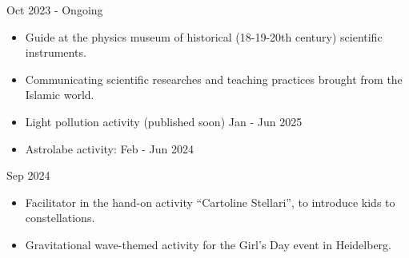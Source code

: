 %
%
%


\begin{experiences}
     {Oct 2023 - Ongoing}%
    {
     \begin{itemize}
         \item Guide at the physics museum of historical (18-19-20th century) scientific instruments.
     \end{itemize}}
     \smallskip
    {
     \begin{itemize}
         \item Communicating scientific researches and teaching practices brought from the Islamic world.
     \end{itemize}}

    \emptySeparator
    {
     \begin{itemize}
         \item Light pollution activity (published soon) \hfill Jan - Jun 2025
         \item Astrolabe activity:  \hfill Feb - Jun 2024
     \end{itemize}}
    \smallskip
     {Sep 2024}%
    {
     \begin{itemize}
         \item Facilitator in the hand-on activity ``Cartoline Stellari'', to introduce kids to constellations.
     \end{itemize}}
     \smallskip
    {
     \begin{itemize}
         \item Gravitational wave-themed activity for the Girl's Day event in Heidelberg.
     \end{itemize}}
     \smallskip


\end{experiences}
